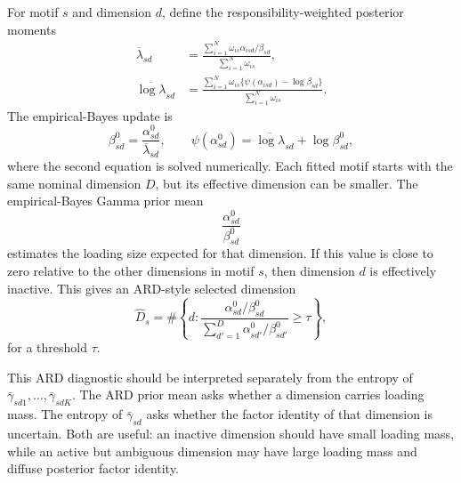 \documentclass[11pt]{article}
\theoremstyle{plain}
\theoremstyle{definition}
\begin{document}
For motif $s$ and dimension $d$, define the responsibility-weighted posterior
moments
\begin{align*}
  \overline\lambda_{sd}
  &=
  \frac{
    \sum_{i=1}^N\omega_{is}\alpha_{isd}/\beta_{sd}
  }{
    \sum_{i=1}^N\omega_{is}
  },\\
  \overline{\log\lambda}_{sd}
  &=
  \frac{
    \sum_{i=1}^N\omega_{is}
    \{\psi(\alpha_{isd})-\log\beta_{sd}\}
  }{
    \sum_{i=1}^N\omega_{is}
  }.
\end{align*}
The empirical-Bayes update is
\begin{equation}
  \beta_{sd}^0=\frac{\alpha_{sd}^0}{\overline\lambda_{sd}},
  \qquad
  \psi(\alpha_{sd}^0)
  =\overline{\log\lambda}_{sd}+\log\beta_{sd}^0,
  \label{eq:miso-eb-update}
\end{equation}
where the second equation is solved numerically. Each fitted motif starts with
the same nominal dimension $D$, but its effective dimension can be smaller.
The empirical-Bayes Gamma prior mean
\[
  \frac{\alpha_{sd}^0}{\beta_{sd}^0}
\]
estimates the loading size expected for that dimension. If this value is close to
zero relative to the other dimensions in motif $s$, then dimension $d$ is effectively
inactive. This gives an ARD-style selected dimension
\[
  \widehat{D}_s
  =
  \#\left\{
    d:
    \frac{\alpha_{sd}^0/\beta_{sd}^0}
         {\sum_{d'=1}^D \alpha_{sd'}^0/\beta_{sd'}^0}
    \geq \tau
  \right\},
\]
for a threshold $\tau$.

This ARD diagnostic should be interpreted separately from the entropy of
$\bar{\gamma}_{sd1},\ldots,\bar{\gamma}_{sdK}$. The ARD prior mean asks whether
a dimension carries loading mass. The entropy of $\bar{\gamma}_{sd}$ asks whether
the factor identity of that dimension is uncertain. Both are useful: an
inactive dimension should have small loading mass, while an active but
ambiguous dimension may have large loading mass and diffuse posterior factor
identity.
\end{document}
